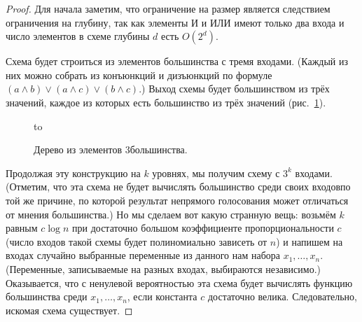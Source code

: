 \begin{proof}
Для начала заметим, что ограничение на размер
является следствием ограничения на глубину, так как элементы И и
ИЛИ имеют только два входа и число элементов в схеме глубины $d$ есть
$O(2^d)$.

Схема будет строиться из элементов большинства с тремя входами.
(Каждый из них можно собрать из конъюнкций и дизъюнкций по
формуле $(a\land b)\lor (a\land c)\lor (b\land c)$.)
Выход схемы будет большинством из трёх значений,
каждое из которых есть большинство из трёх значений 
(рис.~\ref{majority-scheme}).

\begin{figure}[h]
\hbox to 
\caption{Дерево из элементов $3$\д большинства.}
\label{majority-scheme}
\end{figure}

Продолжая эту конструкцию на $k$ уровнях, мы получим схему с
$3^k$ входами. (Отметим, что эта схема не будет вычислять
большинство среди своих входов\т по той же причине, по которой
результат непрямого голосования может отличаться от мнения
большинства.) Но мы сделаем вот какую странную вещь: возьмём $k$
равным $c\log n$ при достаточно большом коэффициенте
пропорциональности $c$ (число входов такой схемы будет
полиномиально зависеть от $n$) и напишем на входах случайно
выбранные переменные из данного нам набора $x_1,\dots,x_n$.
(Переменные, записываемые на разных входах, выбираются
независимо.) Оказывается, что с ненулевой вероятностью эта схема
будет вычислять функцию большинства среди $x_1,\dots,x_n$,
если константа $c$
достаточно велика. Следовательно, искомая схема существует.


\end{proof}
